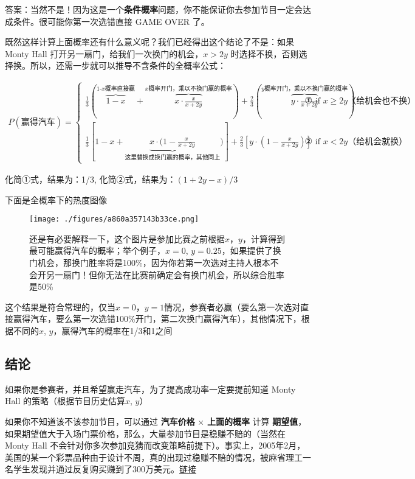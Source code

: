 答案：当然不是！因为这是一个\textbf{条件概率}问题，你不能保证你去参加节目一定会达成条件。很可能你第一次选错直接 GAME OVER 了。

既然这样计算上面概率还有什么意义呢？我们已经得出这个结论了不是：如果 Monty Hall 打开另一扇门，给我们一次换门的机会，$x>2y$ 时选择不换，否则选择换。所以，还需一步就可以推导不含条件的全概率公式：

\begin{align}
\nonumber
P(\text{赢得汽车})=
\begin{cases}
 \frac{1}{3}(\overbrace{1-x}^{\text{1-$x$概率直接赢}}+\overbrace{x\cdot \frac{x}{x+2y}}^{\text{$x$概率开门，乘以不换门赢的概率}})+\frac{2}{3}(\overbrace{y\cdot \frac{x}{x+2y}}^{\text{$y$概率开门，乘以不换门赢的概率}})& \text{ ① if } x\ge2y\text{（给机会也不换）}\\
 \frac{1}{3}[1-x+\underbrace{x\cdot(1- \frac{x}{x+2y}}_{\text{这里替换成换门赢的概率，其他同上}})]+\frac{2}{3}[y\cdot(1- \frac{x}{x+2y})]& \text{ ② if } x\lt2y\text{（给机会就换）}
\end{cases}
\end{align}

化简①式，结果为：1/3,
化简②式，结果为：$(1+2y-x)/3$

下面是全概率下的热度图像

\begin{figure}[ht]
\centering
\texttt{[image: ./figures/a860a357143b33ce.png]}
\caption{还是有必要解释一下，这个图片是参加比赛之前根据$x$，$y$，计算得到最可能赢得汽车的概率；举个例子，$x=0$, $y=0.25$，如果提供了换门机会，那换门胜率将是100\%，因为你若第一次选对主持人根本不会开另一扇门！但你无法在比赛前确定会有换门机会，所以综合胜率是50\%} \label{fig_MontyH2}
\end{figure}

这个结果是符合常理的，仅当$x=0$，$y=1$情况，参赛者必赢（要么第一次选对直接赢得汽车，要么第一次选错100\%开门，第二次换门赢得汽车），其他情况下，根据不同的$x$, $y$，赢得汽车的概率在1/3和1之间

\subsection{结论}
如果你是参赛者，并且希望赢走汽车，为了提高成功率一定要提前知道 Monty Hall 的策略（根据节目历史估算$x$, $y$）

如果你不知道该不该参加节目，可以通过 \textbf{汽车价格} × \textbf{上面的概率} 计算 \textbf{期望值}，如果期望值大于入场门票价格，那么，大量参加节目是稳赚不赔的（当然在 Monty Hall 不会针对你多次参加竞猜而改变策略前提下）。事实上，2005年2月，美国的某一个彩票品种由于设计不周，真的出现过稳赚不赔的情况，被麻省理工一名学生发现并通过反复购买赚到了300万美元。\href{https://www.ruanyifeng.com/blog/2018/04/lottery-mathematics.html}{链接}

